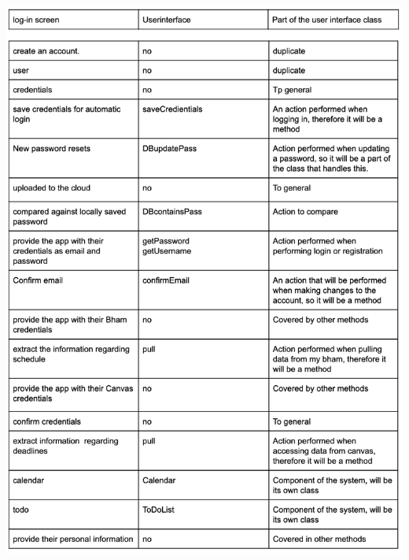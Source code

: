 \documentclass[a4paper,11pt]{article} %
\begin{document}
\begin{center}
    \includegraphics[scale=0.9]{img/noun-verb/page2.png}

\end{center}
\end{document}
